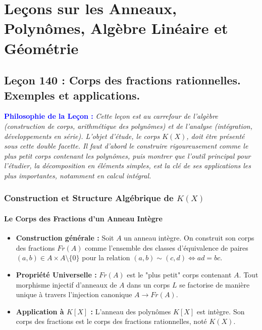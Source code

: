 \documentclass[12pt, a4paper, parskip=full]{report}
\theoremstyle{agregstyle}
\newenvironment{philosophie}
  {\par\medskip\noindent\begin{oframed}\noindent\textbf{\textcolor{blue}{Philosophie de la Leçon :}}\itshape}
  {\end{oframed}\par\medskip}
\begin{document}
\part{Leçons sur les Anneaux, Polynômes, Algèbre Linéaire et Géométrie}

\chapter{Leçon 140 : Corps des fractions rationnelles. Exemples et applications.}

\begin{philosophie}
    Cette leçon est au carrefour de l'algèbre (construction de corps, arithmétique des polynômes) et de l'analyse (intégration, développements en série). L'objet d'étude, le corps $K(X)$, doit être présenté sous cette double facette. Il faut d'abord le construire rigoureusement comme le plus petit corps contenant les polynômes, puis montrer que l'outil principal pour l'étudier, la décomposition en éléments simples, est la clé de ses applications les plus importantes, notamment en calcul intégral.
\end{philosophie}

\section{Construction et Structure Algébrique de $K(X)$}

\subsection{Le Corps des Fractions d'un Anneau Intègre}
\begin{itemize}
    \item \textbf{Construction générale :} Soit $A$ un anneau intègre. On construit son corps des fractions $Fr(A)$ comme l'ensemble des classes d'équivalence de paires $(a,b) \in A \times A \setminus \{0\}$ pour la relation $(a,b) \sim (c,d) \iff ad=bc$.
    \item \textbf{Propriété Universelle :} $Fr(A)$ est le "plus petit" corps contenant $A$. Tout morphisme injectif d'anneaux de $A$ dans un corps $L$ se factorise de manière unique à travers l'injection canonique $A \to Fr(A)$.
    \item \textbf{Application à $K[X]$ :} L'anneau des polynômes $K[X]$ est intègre. Son corps des fractions est le corps des fractions rationnelles, noté $K(X)$.
\end{itemize}
\end{document}
